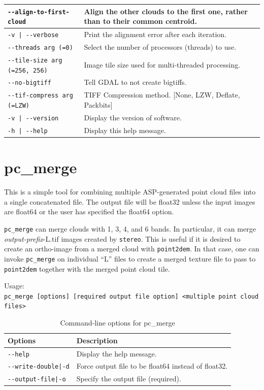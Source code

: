 \begin{longtable}{|l|p{7.5cm}|}
\texttt{-\/-align-to-first-cloud  } & Align the other clouds to the first one, rather than to their common centroid.\\ \hline
\texttt{-v | -\/-verbose   } & Print the alignment error after each iteration.\\ \hline
\texttt{-\/-threads arg (=0) } & Select the number of processors (threads) to use.\\ \hline
\texttt{-\/-tile-size arg (=256, 256) } & Image tile size used for multi-threaded processing.\\ \hline
\texttt{-\/-no-bigtiff  } & Tell GDAL to not create bigtiffs.\\ \hline
\texttt{-\/-tif-compress arg (=LZW) } & TIFF Compression method. [None, LZW, Deflate, Packbits]\\ \hline
\texttt{-v | -\/-version   } & Display the version of software.\\ \hline
\texttt{-h | -\/-help   } & Display this help message.\\ \hline
\end{longtable}

\section{pc\_merge}
\label{pcmerge}

This is a simple tool for combining multiple ASP-generated point cloud files into
a single concatenated file.  The output file will be float32 unless the input images
are float64 or the user has specified the float64 option.

\texttt{pc\_merge} can merge clouds with
1, 3, 4, and 6 bands. In particular, it can merge \textit{output-prefix}-L.tif images
created by \texttt{stereo}. This is useful if it is desired to create an
ortho-image from a merged cloud with \texttt{point2dem}. In that case,
one can invoke \texttt{pc\_merge} on individual ``L'' files to create a
merged texture file to pass to \texttt{point2dem} together with the
merged point cloud tile.


\medskip

Usage:\\
\hspace*{2em}\texttt{pc\_merge [options] [required output file option] <multiple point cloud files>}

\medskip

\begin{longtable}{|l|p{10cm}|}
\caption{Command-line options for pc\_merge}
\label{tbl:pcmerge}
\endfirsthead
\endhead
\endfoot
\endlastfoot
\hline
Options & Description \\ \hline \hline
\texttt{-\/-help} & Display the help message.\\ \hline
\texttt{-\/-write-double|-d} & Force output file to be float64 instead of float32.\\ \hline
\texttt{-\/-output-file|-o} & Specify the output file (required).\\ \hline
\end{longtable}

